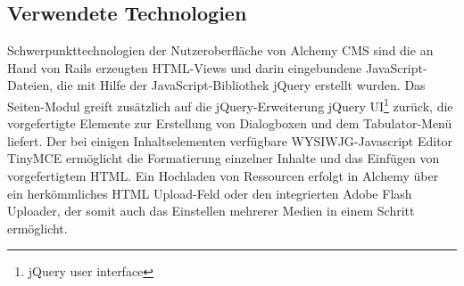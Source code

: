 \subsection{Verwendete Technologien}
Schwerpunkttechnologien der Nutzeroberfläche von Alchemy CMS sind die an Hand von Rails erzeugten HTML-Views und darin eingebundene JavaScript-Dateien, die mit Hilfe der JavaScript-Bibliothek jQuery erstellt wurden.
Das Seiten-Modul greift zusätzlich auf die jQuery-Erweiterung  jQuery UI\footnote{jQuery user interface} zurück, die vorgefertigte Elemente zur Erstellung von Dialogboxen und dem Tabulator-Menü liefert.
Der bei einigen Inhaltselementen verfügbare WYSIWJG-Javascript Editor TinyMCE ermöglicht die Formatierung einzelner Inhalte und das Einfügen von vorgefertigtem HTML.
Ein Hochladen von Ressourcen erfolgt in Alchemy über ein herkömmliches HTML Upload-Feld oder den integrierten Adobe Flash Uploader, der somit auch das Einstellen mehrerer Medien in einem Schritt ermöglicht.




\newpage
